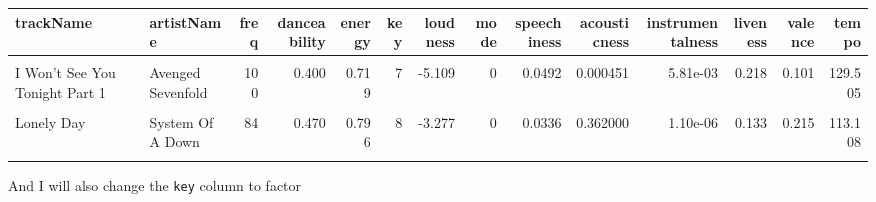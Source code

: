 \documentclass[
]{article}
\newenvironment{Shaded}{\begin{snugshade}}{\end{snugshade}}
\newcommand{\FunctionTok}[1]{\textcolor[rgb]{0.13,0.29,0.53}{\textbf{#1}}}
\newcommand{\NormalTok}[1]{#1}
\newcommand{\OtherTok}[1]{\textcolor[rgb]{0.56,0.35,0.01}{#1}}
\newcommand{\SpecialCharTok}[1]{\textcolor[rgb]{0.81,0.36,0.00}{\textbf{#1}}}
\begin{document}
\begin{table}
\centering
\begin{tabular}{l|l|r|r|r|r|r|r|r|r|r|r|r|r}
\hline
trackName & artistName & freq & danceability & energy & key & loudness & mode & speechiness & acousticness & instrumentalness & liveness & valence & tempo\\
\hline
\cellcolor{gray!6}{Andromeda} & \cellcolor{gray!6}{Weyes Blood} & \cellcolor{gray!6}{144} & \cellcolor{gray!6}{0.467} & \cellcolor{gray!6}{0.461} & \cellcolor{gray!6}{1} & \cellcolor{gray!6}{-7.940} & \cellcolor{gray!6}{0} & \cellcolor{gray!6}{0.0274} & \cellcolor{gray!6}{0.368000} & \cellcolor{gray!6}{1.15e-03} & \cellcolor{gray!6}{0.358} & \cellcolor{gray!6}{0.188} & \cellcolor{gray!6}{131.325}\\
\hline
I Won't See You Tonight Part 1 & Avenged Sevenfold & 100 & 0.400 & 0.719 & 7 & -5.109 & 0 & 0.0492 & 0.000451 & 5.81e-03 & 0.218 & 0.101 & 129.505\\
\hline
\cellcolor{gray!6}{Under The Influence} & \cellcolor{gray!6}{Chris Brown} & \cellcolor{gray!6}{89} & \cellcolor{gray!6}{0.733} & \cellcolor{gray!6}{0.690} & \cellcolor{gray!6}{9} & \cellcolor{gray!6}{-5.529} & \cellcolor{gray!6}{0} & \cellcolor{gray!6}{0.0427} & \cellcolor{gray!6}{0.063500} & \cellcolor{gray!6}{1.20e-06} & \cellcolor{gray!6}{0.105} & \cellcolor{gray!6}{0.310} & \cellcolor{gray!6}{116.992}\\
\hline
Lonely Day & System Of A Down & 84 & 0.470 & 0.796 & 8 & -3.277 & 0 & 0.0336 & 0.362000 & 1.10e-06 & 0.133 & 0.215 & 113.108\\
\hline
\cellcolor{gray!6}{Chop Suey!} & \cellcolor{gray!6}{System Of A Down} & \cellcolor{gray!6}{76} & \cellcolor{gray!6}{0.419} & \cellcolor{gray!6}{0.934} & \cellcolor{gray!6}{7} & \cellcolor{gray!6}{-3.908} & \cellcolor{gray!6}{0} & \cellcolor{gray!6}{0.1200} & \cellcolor{gray!6}{0.000278} & \cellcolor{gray!6}{1.50e-03} & \cellcolor{gray!6}{0.132} & \cellcolor{gray!6}{0.286} & \cellcolor{gray!6}{127.288}\\
\hline
\end{tabular}
\end{table}

And I will also change the \texttt{key} column to factor

\begin{Shaded}
\end{Shaded}
\end{document}

